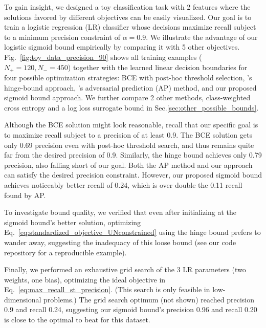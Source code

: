 To gain insight, we designed a toy classification task with 2 features where the solutions favored by different objectives can be easily visualized.
Our goal is to train a logistic regression (LR) classifier whose decisions maximize recall subject to a minimum precision constraint of $\alpha = 0.9$.
We illustrate the advantage of our logistic sigmoid bound empirically by comparing it with 5 other objectives.
Fig.~\ref{fig:toy_data_precision_90} shows all training examples ($N_+ = 120, N_- = 450$) together with the learned linear decision boundaries for four possible optimization strategies: BCE with post-hoc threshold selection, \citet{ebanScalableLearningNonDecomposable2017}'s hinge-bound approach, \citet{fathonyAPperfIncorporatingGeneric2020}'s adversarial prediction (AP) method, and our proposed sigmoid bound approach. We further compare 2 other methods, class-weighted cross entropy and a log loss surrogate bound in Sec.\ref{sec:other_possible_bounds}.

Although the BCE solution might look reasonable, recall that our specific goal is to maximize recall subject to a precision of at least 0.9. The BCE solution gets only 0.69 precision even with post-hoc threshold search, and thus remains quite far from the desired precision of 0.9.
Similarly, the hinge bound achieves only 0.79 precision, also falling short of our goal.
Both the AP method and our approach can satisfy the desired precision constraint. 
However, our proposed sigmoid bound achieves noticeably better recall of 0.24, which is over double the 0.11 recall found by AP.

To investigate bound quality, we verified that even after initializing at the sigmoid bound's better solution, optimizing Eq.~\eqref{eq:standardized_objective_UNconstrained} using the hinge bound prefers to wander away, suggesting the inadequacy of this loose bound (see our code repository for a reproducible example).

Finally, we performed an exhaustive grid search of the 3 LR parameters (two weights, one bias), optimizing the ideal objective in Eq.~\eqref{eq:max_recall_st_precision}. (This search is only feasible in low-dimensional problems.) The grid search optimum (not shown) reached precision 0.9 and recall 0.24, suggesting our sigmoid bound's precision 0.96 and recall 0.20 is close to the optimal to beat for this dataset.
